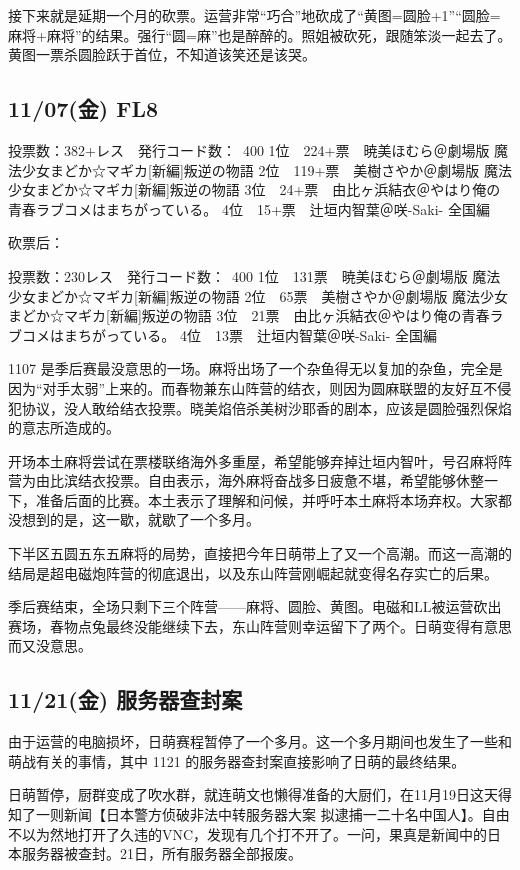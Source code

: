接下来就是延期一个月的砍票。运营非常“巧合”地砍成了“黄图=圆脸+1”“圆脸=麻将+麻将”的结果。强行“圆=麻”也是醉醉的。照姐被砍死，跟随笨淡一起去了。黄图一票杀圆脸跃于首位，不知道该笑还是该哭。

\subsection{11/07(金) FL8}

	投票数：382+レス　発行コード数：~400
	1位　224+票　暁美ほむら＠劇場版 魔法少女まどか☆マギカ[新編]叛逆の物語
	2位　119+票　美樹さやか＠劇場版 魔法少女まどか☆マギカ[新編]叛逆の物語
	3位　24+票　由比ヶ浜結衣＠やはり俺の青春ラブコメはまちがっている。
	4位　15+票　辻垣内智葉＠咲-Saki- 全国編

砍票后：

	投票数：230レス　発行コード数：~400
	1位　131票　暁美ほむら＠劇場版 魔法少女まどか☆マギカ[新編]叛逆の物語
	2位　65票　美樹さやか＠劇場版 魔法少女まどか☆マギカ[新編]叛逆の物語
	3位　21票　由比ヶ浜結衣＠やはり俺の青春ラブコメはまちがっている。
	4位　13票　辻垣内智葉＠咲-Saki- 全国編

1107 是季后赛最没意思的一场。麻将出场了一个杂鱼得无以复加的杂鱼，完全是因为“对手太弱”上来的。而春物兼东山阵营的结衣，则因为圆麻联盟的友好互不侵犯协议，没人敢给结衣投票。晓美焰倍杀美树沙耶香的剧本，应该是圆脸强烈保焰的意志所造成的。

开场本土麻将尝试在票楼联络海外多重屋，希望能够弃掉辻垣内智叶，号召麻将阵营为由比滨结衣投票。自由表示，海外麻将奋战多日疲惫不堪，希望能够休整一下，准备后面的比赛。本土表示了理解和问候，并呼吁本土麻将本场弃权。大家都没想到的是，这一歇，就歇了一个多月。

下半区五圆五东五麻将的局势，直接把今年日萌带上了又一个高潮。而这一高潮的结局是超电磁炮阵营的彻底退出，以及东山阵营刚崛起就变得名存实亡的后果。

季后赛结束，全场只剩下三个阵营——麻将、圆脸、黄图。电磁和LL被运营砍出赛场，春物点兔最终没能继续下去，东山阵营则幸运留下了两个。日萌变得有意思而又没意思。

\subsection{11/21(金) 服务器查封案}

由于运营的电脑损坏，日萌赛程暂停了一个多月。这一个多月期间也发生了一些和萌战有关的事情，其中 1121 的服务器查封案直接影响了日萌的最终结果。

日萌暂停，厨群变成了吹水群，就连萌文也懒得准备的大厨们，在11月19日这天得知了一则新闻【日本警方侦破非法中转服务器大案 拟逮捕一二十名中国人】。自由不以为然地打开了久违的VNC，发现有几个打不开了。一问，果真是新闻中的日本服务器被查封。21日，所有服务器全部报废。

